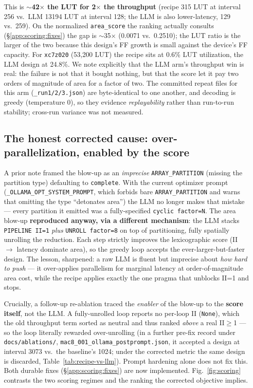 This is \textbf{$\sim$42$\times$ the LUT for 2$\times$ the throughput} (recipe 315 LUT at
interval 256 vs.\ LLM 13194 LUT at interval 128; the LLM is also lower-latency, 129
vs.\ 259). On the normalized \texttt{area\_score} the ranking actually consults
(\S\ref{app:scoring:fixes}) the gap is $\sim$35$\times$ (0.0071 vs.\ 0.2510); the LUT
ratio is the larger of the two because this design's FF growth is small against the
device's FF capacity. For \texttt{xc7z020} (53{,}200 LUT) the recipe sits at 0.6\% LUT
utilization, the LLM design at 24.8\%. We note explicitly that the LLM arm's throughput win is
real: the failure is not that it bought nothing, but that the score let it pay two
orders of magnitude of area for a factor of two. The committed repeat files for this
arm (\texttt{\_run1/2/3.json}) are byte-identical to one another, and decoding is
greedy (temperature 0), so they evidence \emph{replayability} rather than run-to-run
stability; cross-run variance was not measured.

\subsection{The honest corrected cause: over-parallelization, enabled by the score}\label{app:scoring:cause}

A prior note framed the blow-up as an \emph{imprecise} \texttt{ARRAY\_PARTITION}
(missing the partition type) defaulting to \texttt{complete}. With the current
optimizer prompt (\texttt{\_OLLAMA\_OPT\_SYSTEM\_PROMPT}, which forbids bare
\texttt{ARRAY\_PARTITION} and warns that omitting the type ``detonates area'') the LLM
no longer makes that mistake --- every partition it emitted was a fully-specified
\texttt{cyclic factor=N}. The area blow-up \textbf{reproduced anyway, via a different
mechanism}: the LLM stacks \texttt{PIPELINE II=1} \emph{plus} \texttt{UNROLL factor=8}
on top of partitioning, fully spatially unrolling the reduction. Each step strictly
improves the lexicographic score (II $\rightarrow$ latency dominate area), so the
greedy loop accepts the ever-larger-but-faster design. The lesson, sharpened: a raw
LLM is fluent but imprecise about \emph{how hard to push} --- it over-applies
parallelism for marginal latency at order-of-magnitude area cost, while the recipe
applies exactly the one pragma that unblocks II=1 and stops.

Crucially, a follow-up re-ablation traced the \emph{enabler} of the blow-up to the
\textbf{score itself}, not the LLM. A fully-unrolled loop reports no per-loop II
(\texttt{None}), which the old throughput term sorted as neutral and thus ranked
\emph{above} a real II$\geq$1 --- so the loop literally rewarded over-unrolling (in a
further pre-fix record under \texttt{docs/ablations/},
\texttt{mac8\_001\_ollama\_postprompt.json}, it accepted a design at interval 3073
vs.\ the baseline's 1024; under the corrected metric the same design is discarded,
Table~\ref{tab:recipe-vs-llm}). Prompt hardening
alone does not fix this. Both durable fixes (\S\ref{app:scoring:fixes}) are now
implemented. Fig.~\ref{fig:scoring} contrasts the two scoring regimes and the ranking
the corrected objective implies.

